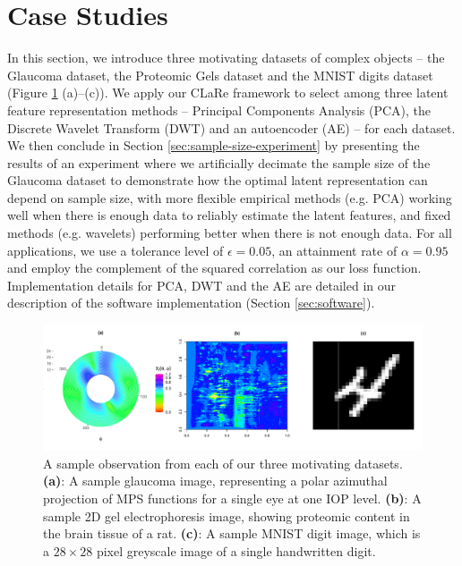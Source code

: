 \section{Case Studies}\label{sec:case-studies}

In this section, we introduce three motivating datasets of complex objects -- the Glaucoma dataset, the Proteomic Gels dataset and the MNIST digits dataset (Figure \ref{fig:combined-data-objects} (a)--(c)).
We apply our CLaRe framework to select among three latent feature representation methods -- Principal Components Analysis (PCA), the Discrete Wavelet Transform (DWT) and an autoencoder (AE) -- for each dataset.
We then conclude in Section \ref{sec:sample-size-experiment} by presenting the results of an experiment where we artificially decimate the sample size of the Glaucoma dataset to demonstrate how the optimal latent representation can depend on sample size, with more flexible empirical methods (e.g. PCA) working well when there is enough data to reliably estimate the latent features, and fixed methods (e.g. wavelets) performing better when there is not enough data.
For all applications, we use a tolerance level of $\epsilon = 0.05$, an attainment rate of $\alpha=0.95$ and employ the complement of the squared correlation as our loss function.
Implementation details for PCA, DWT and the AE are detailed in our description of the software implementation (Section \ref{sec:software}).

\begin{figure}
    \centering
    \includegraphics[width=1\textwidth]{figures/data-plot.pdf}
    \caption{
    A sample observation from each of our three motivating datasets.
    \textbf{(a)}: A sample glaucoma image, representing a polar azimuthal projection of MPS functions for a single eye at one IOP level.
    \textbf{(b)}: A sample 2D gel electrophoresis image, showing proteomic content in the brain tissue of a rat.
    \textbf{(c)}: A sample MNIST digit image, which is a $28 \times 28$ pixel greyscale image of a single handwritten digit.}
    \label{fig:combined-data-objects}
\end{figure}



